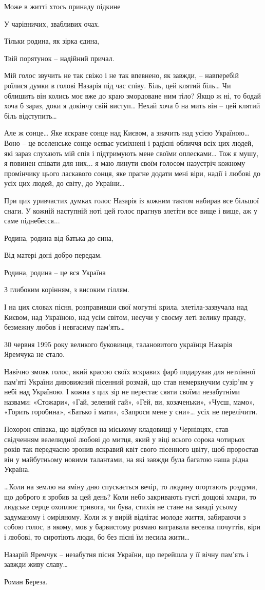 Може в житті хтось принаду підкине

У чарівничих, звабливих очах.

Тільки родина, як зірка єдина,

Твій порятунок – надійний причал.

Мій голос звучить не так свіжо і не так впевнено, як завжди, – навперебій
роїлися думки в голові Назарія під час співу. Біль, цей клятий біль… Чи
облишить він колись моє вже до краю змордоване ним тіло? Якщо ж ні, то бодай
хоча б зараз, доки я докінчу свій виступ… Нехай хоча б на мить він – цей клятий
біль відступить… 

Але ж сонце… Яке яскраве сонце над Києвом, а значить над усією Україною… Воно –
це вселенське сонце осяває усміхнені і радісні обличчя всіх цих людей, які
зараз слухають мій спів і підтримують мене своїми оплесками… Тож я мушу, я
повинен співати для них,..  я маю линути своїм голосом назустріч кожному
промінчику цього ласкавого сонця, яке прагне додати мені віри, надії і любові
до усіх цих людей, до світу, до України…

При цих уривчастих думках голос Назарія із кожним тактом набирав все більшої
снаги. У кожній наступній ноті цей голос прагнув злетіти все вище і вище, аж у
саме піднебесся... 

Родина, родина від батька до сина,

Від матері доні добро передам.

Родина, родина – це вся Україна

З глибоким корінням, з високим гіллям.

І на цих словах пісня, розправивши свої могутні крила, злетіла-зазвучала над
Києвом, над Україною, над усім світом, несучи у своєму леті велику правду,
безмежну любов і невгасиму пам’ять…

30 червня 1995 року великого буковинця, талановитого українця Назарія Яремчука
не стало. 

Навічно змовк голос, який красою своїх яскравих фарб подарував для нетлінної
пам’яті України дивовижний пісенний розмай, що став немеркнучим сузір’ям у небі
над Україною. І кожна з цих зір не перестає сяяти своїми незабутніми назвами:
«Стожари», «Гай, зелений гай», «Гей, ви, козаченьки», «Чуєш, мамо», «Горить
горобина», «Батько і мати», «Запроси мене у сни»… усіх не перелічити.

Похорон співака, що відбувся на міському кладовищі у Чернівцях, став свідченням
велелюдної любові до митця, який у віці всього сорока чотирьох років так
передчасно зронив яскравий квіт свого пісенного цвіту, щоб проростав він у
майбутньому новими талантами, на які завжди була багатою наша рідна Україна. 

…Коли на землю на зміну дню спускається вечір, то людину огортають роздуми, що
доброго я зробив за цей день? Коли небо закривають густі дощові хмари, то
людське серце охоплює тривога, чи бува, стихія не стане на заваді усьому
задуманому і омріяному. Коли ж у вирій відлітає молоде життя, забираючи з собою
голос, в якому, мов у барвистому розмаю вигравала веселка почуттів, віри і
любові, то сиротіють  люди, бо без пісні їм несила жити…

Назарій Яремчук – незабутня пісня України, що перейшла у її вічну пам'ять і
завжди живу славу… 

Роман Береза.
